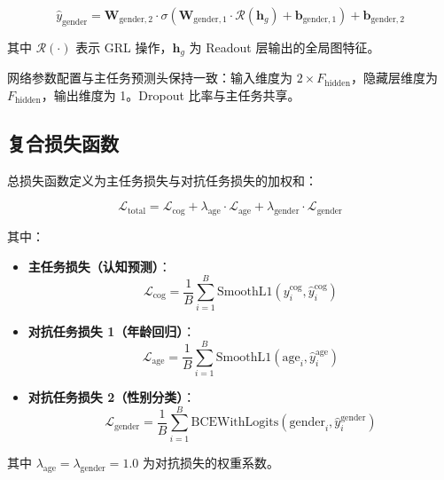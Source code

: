 \begin{equation}
\hat{y}_{\text{gender}} = \mathbf{W}_{\text{gender},2} \cdot \sigma\left( \mathbf{W}_{\text{gender},1} \cdot \mathcal{R}(\mathbf{h}_g) + \mathbf{b}_{\text{gender},1} \right) + \mathbf{b}_{\text{gender},2}
\end{equation}

其中 $\mathcal{R}(\cdot)$ 表示 GRL 操作，$\mathbf{h}_g$ 为 Readout 层输出的全局图特征。

网络参数配置与主任务预测头保持一致：输入维度为 $2 \times F_{\text{hidden}}$，隐藏层维度为 $F_{\text{hidden}}$，输出维度为 1。Dropout 比率与主任务共享。

\subsection{复合损失函数}

总损失函数定义为主任务损失与对抗任务损失的加权和：

\begin{equation}
\mathcal{L}_{\text{total}} = \mathcal{L}_{\text{cog}} + \lambda_{\text{age}} \cdot \mathcal{L}_{\text{age}} + \lambda_{\text{gender}} \cdot \mathcal{L}_{\text{gender}}
\end{equation}

其中：

\begin{itemize}
    \item \textbf{主任务损失（认知预测）}：
    \begin{equation}
    \mathcal{L}_{\text{cog}} = \frac{1}{B} \sum_{i=1}^{B} \text{SmoothL1}(y_i^{\text{cog}}, \hat{y}_i^{\text{cog}})
    \end{equation}

    \item \textbf{对抗任务损失 1（年龄回归）}：
    \begin{equation}
    \mathcal{L}_{\text{age}} = \frac{1}{B} \sum_{i=1}^{B} \text{SmoothL1}(\text{age}_i, \hat{y}_i^{\text{age}})
    \end{equation}

    \item \textbf{对抗任务损失 2（性别分类）}：
    \begin{equation}
    \mathcal{L}_{\text{gender}} = \frac{1}{B} \sum_{i=1}^{B} \text{BCEWithLogits}(\text{gender}_i, \hat{y}_i^{\text{gender}})
    \end{equation}
\end{itemize}

其中 $\lambda_{\text{age}} = \lambda_{\text{gender}} = 1.0$ 为对抗损失的权重系数。

